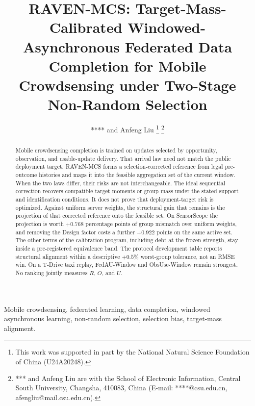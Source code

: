 \documentclass[letterpaper,journal]{IEEEtran}
\begin{document}
\title{RAVEN-MCS: Target-Mass-Calibrated Windowed-Asynchronous Federated Data Completion for Mobile Crowdsensing under Two-Stage Non-Random Selection}

\author{**** and Anfeng Liu%
\thanks{This work was supported in part by the National Natural Science Foundation of China (U24A20248).}%
\thanks{*** and Anfeng Liu are with the School of Electronic Information, Central South University, Changsha, 410083, China (E-mail: ****@csu.edu.cn, afengliu@mail.csu.edu.cn).}%
}


\maketitle


\begin{abstract}
Mobile crowdsensing completion is trained on updates selected by opportunity,
observation, and usable-update delivery.  That arrival law need not match the
public deployment target.  RAVEN-MCS forms a selection-corrected reference from
legal pre-outcome histories and maps it into the feasible aggregation set of the
current window.  When the two laws differ, their risks are not interchangeable.
The ideal sequential correction recovers compatible target moments or group mass
under the stated support and identification conditions.  It does not prove that
deployment-target risk is optimized.  Against uniform server weights, the
structural gain that remains is the projection of that corrected reference onto
the feasible set.  On SensorScope the projection is worth $+0.768$ percentage
points of group mismatch over uniform weights, and removing the Design factor
costs a further $+0.922$ points on the same active set.  The other terms of the
calibration program, including debt at the frozen strength, stay inside a
pre-registered equivalence band.  The protocol development table reports
structural alignment within a descriptive $+0.5\%$ worst-group tolerance, not an
RMSE win.  On a T-Drive taxi replay, FedAU-Window and ObsUse-Window remain
strongest.  No ranking jointly measures $R$, $O$, and $U$.
\end{abstract}

\begin{IEEEkeywords}
Mobile crowdsensing, federated learning, data completion, windowed asynchronous learning, non-random selection, selection bias, target-mass alignment.
\end{IEEEkeywords}
\end{document}
